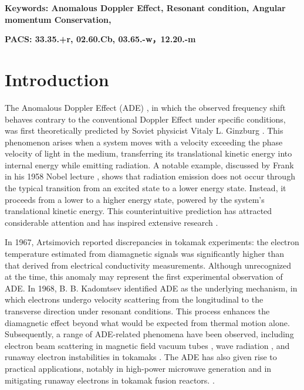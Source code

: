 \documentclass{cpbtex3}
\begin{document}
\textbf{Keywords: Anomalous Doppler Effect, Resonant condition, Angular momentum Conservation,  } %

\textbf{PACS: 33.35.+r, 02.60.Cb,  03.65.-w，12.20.-m} %


\section{Introduction}
The Anomalous Doppler Effect (ADE) \cite{tamm1959general,frank1960optics,ginzburg1960certain,shustin1971transformation}, in which the observed frequency shift behaves contrary to the conventional Doppler Effect under specific conditions, was first theoretically predicted by Soviet physicist Vitaly L. Ginzburg \cite{ginzburg1946radiation}. This phenomenon arises when a system moves with a velocity exceeding the phase velocity of light in the medium, transferring its translational kinetic energy into internal energy while emitting radiation. A notable example, discussed by Frank in his 1958 Nobel lecture \cite{frank1960optics}, shows that radiation emission does not occur through the typical transition from an excited state to a lower energy state. Instead, it proceeds from a lower to a higher energy state, powered by the system's translational kinetic energy. This counterintuitive prediction has attracted considerable attention and has inspired extensive research \cite{nezlin1976negative,santini1984anomalous,kho1988slow,wang2016multi,guo2018control,liu2018role,shi2018superlight,filatov2021role}.

In 1967, Artsimovich \cite{artsimovich1967thermal} reported discrepancies in tokamak experiments: the electron temperature estimated from diamagnetic signals was significantly higher than that derived from electrical conductivity measurements. Although unrecognized at the time, this anomaly may represent the first experimental observation of ADE. In 1968, B. B. Kadomtsev \cite{kadomtsev1968electric} identified ADE as the underlying mechanism, in which electrons undergo velocity scattering from the longitudinal to the transverse direction under resonant conditions. This process enhances the diamagnetic effect beyond what would be expected from thermal motion alone. Subsequently, a range of ADE-related phenomena have been observed, including electron beam scattering in magnetic field vacuum tubes \cite{frank1960optics}, wave radiation \cite{spong2018first,liu2019intense,gorozhanin1997waves}, and runaway electron instabilities in tokamaks \cite{sajjad2007runaway,castejon2003particle}. The ADE has also given rise to practical applications, notably in high-power microwave generation and in mitigating runaway electrons in tokamak fusion reactors. \cite{guo2018control,zhang2024self}.
\end{document}
